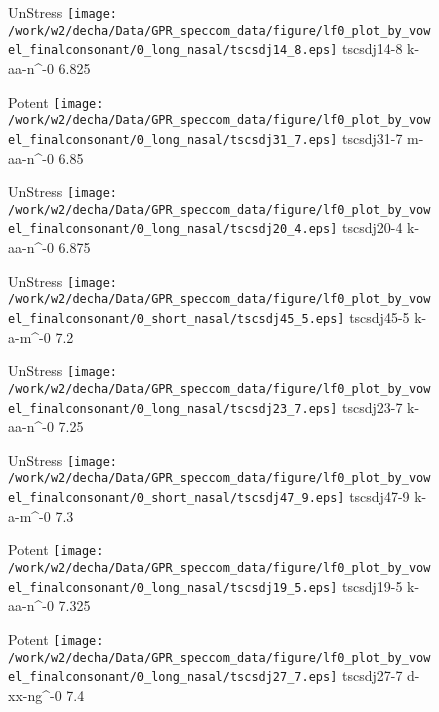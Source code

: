 \documentclass{article}
\begin{document}
\begin{figure}[t]
\begin{minipage}[b]{.24\textwidth}
UnStress
\centering
\texttt{[image: /work/w2/decha/Data/GPR\_speccom\_data/figure/lf0\_plot\_by\_vowel\_finalconsonant/0\_long\_nasal/tscsdj14\_8.eps]}
tscsdj14-8 k-aa-n\textasciicircum-0 6.825
\end{minipage}
\begin{minipage}[b]{.24\textwidth}
\colorbox{Apricot}{Potent}
\centering
\texttt{[image: /work/w2/decha/Data/GPR\_speccom\_data/figure/lf0\_plot\_by\_vowel\_finalconsonant/0\_long\_nasal/tscsdj31\_7.eps]}
tscsdj31-7 m-aa-n\textasciicircum-0 6.85
\end{minipage}
\begin{minipage}[b]{.24\textwidth}
UnStress
\centering
\texttt{[image: /work/w2/decha/Data/GPR\_speccom\_data/figure/lf0\_plot\_by\_vowel\_finalconsonant/0\_long\_nasal/tscsdj20\_4.eps]}
tscsdj20-4 k-aa-n\textasciicircum-0 6.875
\end{minipage}
\begin{minipage}[b]{.24\textwidth}
UnStress
\centering
\texttt{[image: /work/w2/decha/Data/GPR\_speccom\_data/figure/lf0\_plot\_by\_vowel\_finalconsonant/0\_short\_nasal/tscsdj45\_5.eps]}
tscsdj45-5 k-a-m\textasciicircum-0 7.2
\end{minipage}
\end{figure}

\begin{figure}[t]
\begin{minipage}[b]{.24\textwidth}
UnStress
\centering
\texttt{[image: /work/w2/decha/Data/GPR\_speccom\_data/figure/lf0\_plot\_by\_vowel\_finalconsonant/0\_long\_nasal/tscsdj23\_7.eps]}
tscsdj23-7 k-aa-n\textasciicircum-0 7.25
\end{minipage}
\begin{minipage}[b]{.24\textwidth}
UnStress
\centering
\texttt{[image: /work/w2/decha/Data/GPR\_speccom\_data/figure/lf0\_plot\_by\_vowel\_finalconsonant/0\_short\_nasal/tscsdj47\_9.eps]}
tscsdj47-9 k-a-m\textasciicircum-0 7.3
\end{minipage}
\begin{minipage}[b]{.24\textwidth}
\colorbox{Apricot}{Potent}
\centering
\texttt{[image: /work/w2/decha/Data/GPR\_speccom\_data/figure/lf0\_plot\_by\_vowel\_finalconsonant/0\_long\_nasal/tscsdj19\_5.eps]}
tscsdj19-5 k-aa-n\textasciicircum-0 7.325
\end{minipage}
\begin{minipage}[b]{.24\textwidth}
\colorbox{Apricot}{Potent}
\centering
\texttt{[image: /work/w2/decha/Data/GPR\_speccom\_data/figure/lf0\_plot\_by\_vowel\_finalconsonant/0\_long\_nasal/tscsdj27\_7.eps]}
tscsdj27-7 d-xx-ng\textasciicircum-0 7.4
\end{minipage}
\end{figure}
\end{document}
